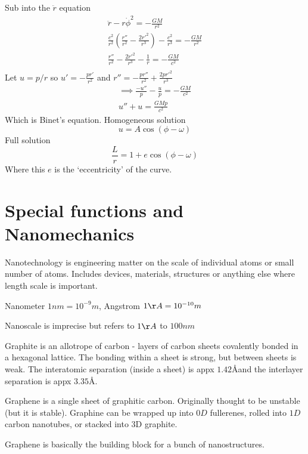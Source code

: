 \documentclass{E:/Documents/Latex/myassignment}
\begin{document}
Sub into the $\ddot r$ equation
\begin{align*}
	\ddot r - r \dot\phi^2 = -\frac{GM}{r^2}\\
	\frac{c^2}{r^2} \left(\frac{r''}{r^2} - \frac{2r'^2}{r^3}\right) - \frac{c^2}{r^3} = - \frac{GM}{r^2}\\
	\frac{r''}{r^2} - \frac{2r'^2}{r^3} - \frac{1}{r} = - \frac{GM}{c^2}\\
\end{align*}
Let $u = p/r$ so $u' = -\frac{pr'}{r^2}$ and $r'' = -\frac{pr''}{r^2} + \frac{2pr'^2}{r^3}$
\begin{align*}
\implies \frac{-u''}{p} - \frac{u}{p} = -\frac{GM}{c^2}	\\
u'' + u = \frac{GMp}{c^2}
\end{align*}
Which is Binet's equation.
Homogeneous solution
\[u = A\cos(\phi - \omega)\]
Full solution
\[\frac{L}{r} = 1 + e\cos(\phi - \omega)\]
Where this $e$ is the `eccentricity' of the curve.






\section{Special functions and Nanomechanics}
Nanotechnology is engineering matter on the scale of individual atoms or small number of atoms. Includes devices, materials, structures or anything else where length scale is important.

Nanometer $1nm = 10^{-9} m$, Angstrom $1 \AA = 10^{-10} m$

Nanoscale is imprecise but refers to $1\AA$ to $100nm$

Graphite is an allotrope of carbon - layers of carbon sheets covalently bonded in a hexagonal lattice. The bonding within a sheet is strong, but between sheets is weak.
The interatomic separation (inside a sheet) is appx $1.42$\AA  and the interlayer separation is appx $3.35$\AA.

Graphene is a single sheet of graphitic carbon. Originally thought to be unstable (but it is stable). Graphine can be wrapped up into $0D$ fullerenes, rolled into $1D$ carbon nanotubes, or stacked into $3$D graphite.

Graphene is basically the building block for a bunch of nanostructures.
\end{document}
